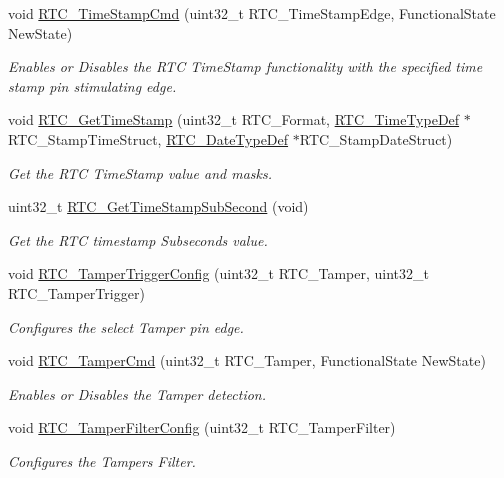 \begin{DoxyCompactItemize}
void \hyperlink{group___r_t_c_ga7d80fa4a2c87654598d8207154ac8e96}{R\-T\-C\-\_\-\-Time\-Stamp\-Cmd} (uint32\-\_\-t R\-T\-C\-\_\-\-Time\-Stamp\-Edge, Functional\-State New\-State)
\begin{DoxyCompactList}\small\item\em Enables or Disables the R\-T\-C Time\-Stamp functionality with the specified time stamp pin stimulating edge. \end{DoxyCompactList}\item 
void \hyperlink{group___r_t_c_ga44c38b0c74e9e960a4263b2905f44796}{R\-T\-C\-\_\-\-Get\-Time\-Stamp} (uint32\-\_\-t R\-T\-C\-\_\-\-Format, \hyperlink{struct_r_t_c___time_type_def}{R\-T\-C\-\_\-\-Time\-Type\-Def} $\ast$R\-T\-C\-\_\-\-Stamp\-Time\-Struct, \hyperlink{struct_r_t_c___date_type_def}{R\-T\-C\-\_\-\-Date\-Type\-Def} $\ast$R\-T\-C\-\_\-\-Stamp\-Date\-Struct)
\begin{DoxyCompactList}\small\item\em Get the R\-T\-C Time\-Stamp value and masks. \end{DoxyCompactList}\item 
uint32\-\_\-t \hyperlink{group___r_t_c_ga2b0ef81f4959a2f9fc6361fbda759b00}{R\-T\-C\-\_\-\-Get\-Time\-Stamp\-Sub\-Second} (void)
\begin{DoxyCompactList}\small\item\em Get the R\-T\-C timestamp Subseconds value. \end{DoxyCompactList}\item 
void \hyperlink{group___r_t_c_gad547d636cfc4fd8d4d673325571e0ffb}{R\-T\-C\-\_\-\-Tamper\-Trigger\-Config} (uint32\-\_\-t R\-T\-C\-\_\-\-Tamper, uint32\-\_\-t R\-T\-C\-\_\-\-Tamper\-Trigger)
\begin{DoxyCompactList}\small\item\em Configures the select Tamper pin edge. \end{DoxyCompactList}\item 
void \hyperlink{group___r_t_c_gaf85cc696d624da0de9fbe99779402833}{R\-T\-C\-\_\-\-Tamper\-Cmd} (uint32\-\_\-t R\-T\-C\-\_\-\-Tamper, Functional\-State New\-State)
\begin{DoxyCompactList}\small\item\em Enables or Disables the Tamper detection. \end{DoxyCompactList}\item 
void \hyperlink{group___r_t_c_ga1e87b9ae757ad12d7585e4fbcbf2c4b8}{R\-T\-C\-\_\-\-Tamper\-Filter\-Config} (uint32\-\_\-t R\-T\-C\-\_\-\-Tamper\-Filter)
\begin{DoxyCompactList}\small\item\em Configures the Tampers Filter. \end{DoxyCompactList}\item 

\end{DoxyCompactItemize}
